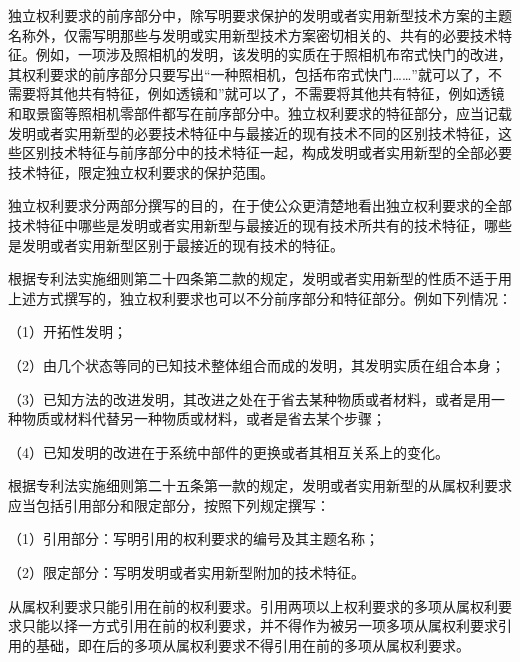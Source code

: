 独立权利要求的前序部分中，除写明要求保护的发明或者实用新型技术方案的主题名称外，仅需写明那些与发明或实用新型技术方案密切相关的、共有的必要技术特征。例如，一项涉及照相机的发明，该发明的实质在于照相机布帘式快门的改进，其权利要求的前序部分只要写出“一种照相机，包括布帘式快门……”就可以了，不需要将其他共有特征，例如透镜和”就可以了，不需要将其他共有特征，例如透镜和取景窗等照相机零部件都写在前序部分中。独立权利要求的特征部分，应当记载发明或者实用新型的必要技术特征中与最接近的现有技术不同的区别技术特征，这些区别技术特征与前序部分中的技术特征一起，构成发明或者实用新型的全部必要技术特征，限定独立权利要求的保护范围。

独立权利要求分两部分撰写的目的，在于使公众更清楚地看出独立权利要求的全部技术特征中哪些是发明或者实用新型与最接近的现有技术所共有的技术特征，哪些是发明或者实用新型区别于最接近的现有技术的特征。

根据专利法实施细则第二十四条第二款的规定，发明或者实用新型的性质不适于用上述方式撰写的，独立权利要求也可以不分前序部分和特征部分。例如下列情况：

{\setlength{\parindent}{17.1bp}（1）开拓性发明；\par}

{\setlength{\parindent}{17.1bp}（2）由几个状态等同的已知技术整体组合而成的发明，其发明实质在组合本身；\par}

{\setlength{\parindent}{17.1bp}（3）已知方法的改进发明，其改进之处在于省去某种物质或者材料，或者是用一种物质或材料代替另一种物质或材料，或者是省去某个步骤；\par}

{\setlength{\parindent}{17.1bp}（4）已知发明的改进在于系统中部件的更换或者其相互关系上的变化。\par}

根据专利法实施细则第二十五条第一款的规定，发明或者实用新型的从属权利要求应当包括引用部分和限定部分，按照下列规定撰写：

{\setlength{\parindent}{17.1bp}（1）引用部分：写明引用的权利要求的编号及其主题名称；\par}

{\setlength{\parindent}{17.1bp}（2）限定部分：写明发明或者实用新型附加的技术特征。\par}

从属权利要求只能引用在前的权利要求。引用两项以上权利要求的多项从属权利要求只能以择一方式引用在前的权利要求，并不得作为被另一项多项从属权利要求引用的基础，即在后的多项从属权利要求不得引用在前的多项从属权利要求。

